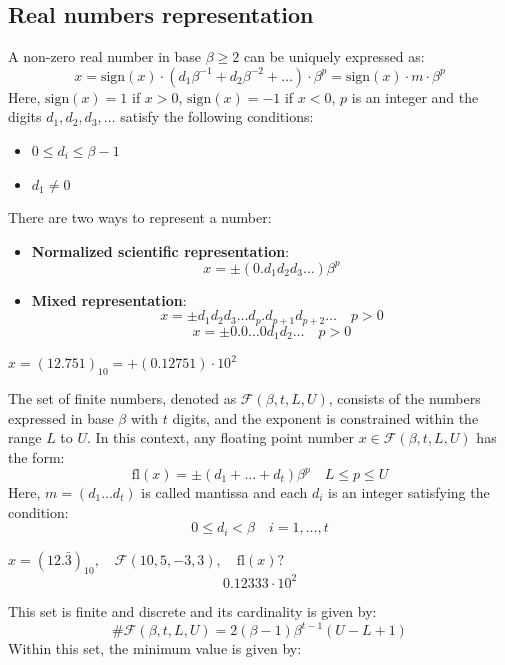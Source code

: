 \documentclass{article}
\begin{document}
\subsection{Real numbers representation}
\begin{theorem}
    A non-zero real number in base $\beta\geq2$ can be uniquely expressed as:
    $$x=\text{sign}(x)\cdot(d_1\beta^{-1}+d_2\beta^{-2}+\ldots)\cdot\beta^p=\text{sign}(x)\cdot
    m\cdot\beta^p$$
    Here, $\text{sign}(x)=1$ if $x>0$, $\text{sign}(x)=-1$ if $x<0$, $p$ is an
    integer and the digits $d_1,d_2,d_3,\ldots$ satisfy the following
    conditions:
\end{theorem}
\begin{itemize}
    \item $0\leq d_i\leq\beta-1$
    \item $d_1\neq0$
\end{itemize}
There are two ways to represent a number:
\begin{itemize}
    \item \textbf{Normalized scientific representation}:
        $$x=\pm(0.d_1d_2d_3\ldots)\beta^p$$
    \item \textbf{Mixed representation}: 
        $$x=\pm d_1d_2d_3\ldots d_p.d_{p+1}d_{p+2}\ldots\quad p>0$$
        $$x=\pm 0.0\ldots0d_1d_2\ldots \quad p>0$$
\end{itemize}
\begin{example}
    $x=(12.751)_{10}=+(0.12751)\cdot10^2$ 
\end{example}
\begin{definition}
    The set of finite numbers, denoted as $\mathcal{F}(\beta,t,L,U)$, consists
    of the numbers expressed in base $\beta$ with $t$ digits, and the exponent
    is constrained within the range $L$ to $U$. In this context, any floating
    point number $x\in\mathcal{F}(\beta,t,L,U)$ has the form: 
    $$\text{fl}(x)=\pm(d_1+\ldots+d_t)\beta^p\quad L\leq p\leq U$$
    Here, $m=(d_1\ldots d_t)$ is called mantissa and 
    each $d_i$ is an integer satisfying the condition: 
    $$0\leq d_i<\beta\quad i=1,\ldots,t$$
\end{definition}
\begin{example}
    $x=(12.\bar{3})_{10},\quad\mathcal{F}(10,5,-3,3),\quad \text{fl}(x)?$
    $$0.12333\cdot10^2$$
\end{example}
This set is finite and discrete and its cardinality is given by:
$$\#\mathcal{F}(\beta,t,L,U)=2(\beta-1)\beta^{t-1}(U-L+1)$$
Within this set, the minimum value is given by:
\end{document}
